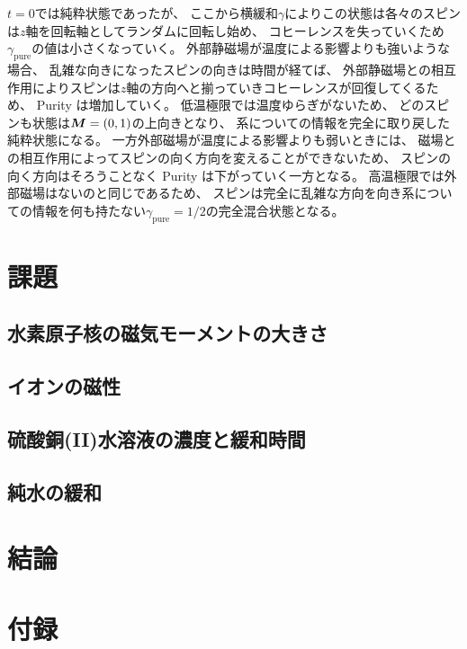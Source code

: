 \documentclass[11pt,dvipdfmx,a4paper]{jsarticle}
\begin{document}
\(t=0\)では純粋状態であったが、
ここから横緩和\(\gamma\)によりこの状態は各々のスピンは\(z\)軸を回転軸としてランダムに回転し始め、
コヒーレンスを失っていくため\(\gamma_{\text{pure}}\)の値は小さくなっていく。
外部静磁場が温度による影響よりも強いような場合、
乱雑な向きになったスピンの向きは時間が経てば、
外部静磁場との相互作用によりスピンは\(z\)軸の方向へと揃っていきコヒーレンスが回復してくるため、
Purity は増加していく。
低温極限では温度ゆらぎがないため、
どのスピンも状態は\(\vb*{M}=(0,1)\)の上向きとなり、
系についての情報を完全に取り戻した純粋状態になる。
一方外部磁場が温度による影響よりも弱いときには、
磁場との相互作用によってスピンの向く方向を変えることができないため、
スピンの向く方向はそろうことなく Purity は下がっていく一方となる。
高温極限では外部磁場はないのと同じであるため、
スピンは完全に乱雑な方向を向き系についての情報を何も持たない\(\gamma_{\text{pure}}=1/2\)の完全混合状態となる。

\section{課題}
\subsection{水素原子核の磁気モーメントの大きさ}

\subsection{イオンの磁性}

\subsection{硫酸銅(II)水溶液の濃度と緩和時間}

\subsection{純水の緩和}

\section{結論}





\section*{付録}
\end{document}
